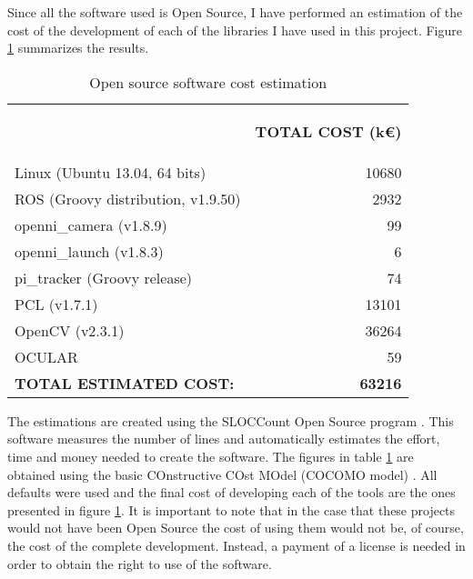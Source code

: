 		Since all the software used is Open Source, I have performed an estimation of the cost of the development of each of the libraries I have used in this project. 
		Figure \ref{estimations} summarizes the results.  






\begin{table}[H]
\centering
\begin{tabular} {l r}
\toprule
\addlinespace[3mm]
   \multicolumn{1}{c}{\begin{center}\textbf{SOFTWARE}\end{center}} &
   \multicolumn{1}{c}{\begin{center}\textbf{TOTAL COST (k\euro)}\end{center}} &
\\
\addlinespace[-3mm]
\midrule
Linux	(Ubuntu 13.04, 64 bits) &	10680%
	\\
ROS		(Groovy distribution, v1.9.50)&	2932%
\\
\hspace*{0.5cm}	openni\_camera	(v1.8.9)&	99%
\\
\hspace*{0.5cm}	openni\_launch	(v1.8.3)&	6%
\\
\hspace*{0.5cm}	pi\_tracker 	(Groovy release)&	74%
\\
PCL	(v1.7.1)	&	13101%
\\
OpenCV	(v2.3.1)	&	36264	%
\\
OCULAR	&	59 	%
	\\
\midrule

\textbf{TOTAL ESTIMATED COST: } & \textbf{63216}\\

\bottomrule
\end{tabular}
\caption[Open source software cost estimation]{Open source software cost estimation}
\label{estimations}

\end{table}


		The estimations are created using the SLOCCount Open Source program \cite{sloccount}. 
		This software measures the number of lines and automatically estimates the effort, time and money needed to create the software. 
		The figures in table \ref{estimations} are obtained using the basic COnstructive COst MOdel (COCOMO model) \cite{Boehm}. 
		All defaults were used and the final cost of developing each of the tools are the ones presented in figure \ref{estimations}. 
		It is important to note that in the case that these projects would not have been Open Source the cost of using them would not be, of course, the cost of the complete development. 
		Instead, a payment of a license is needed in order to obtain the right to use of the software. 
		\\

